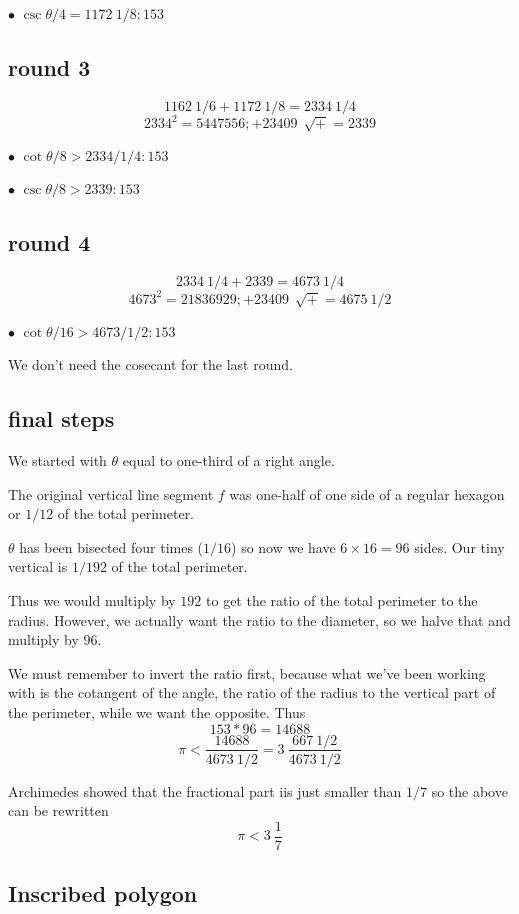 \documentclass[11pt, oneside]{article}
\begin{document}
$\bullet$  $\csc \theta/4 =1172 \ 1/8:153$

\subsection*{round 3}
\[ 1162 \ 1/6 + 1172 \ 1/8 = 2334 \ 1/4 \]
\[ 2334^2 = 5447556;  + 23409 \ \ \sqrt{+} = 2339 \]

$\bullet$  $\cot \theta/8 > 2334 / 1/4:153$ 

$\bullet$  $\csc \theta/8 > 2339:153$

\subsection*{round 4}
\[ 2334 \ 1/4 + 2339 = 4673 \ 1/4 \]
\[ 4673^2 = 21836929;  + 23409 \ \  \sqrt{+} = 4675 \ 1/2 \]

$\bullet$  $\cot \theta/16 > 4673 / 1/2:153$ 

We don't need the cosecant for the last round. 

\subsection*{final steps}
We started with $\theta$ equal to one-third of a right angle.  

The original vertical line segment $f$ was one-half of one side of a regular hexagon or $1/12$ of the total perimeter.

$\theta$ has been bisected four times ($1/16$) so now we have $6 \times 16 = 96$ sides.  Our tiny vertical is $1/192$ of the total perimeter.

Thus we would multiply by $192$ to get the ratio of the total perimeter to the radius.  However, we actually want the ratio to the diameter, so we halve that and multiply by $96$.

We must remember to invert the ratio first, because what we've been working with is the cotangent of the angle, the ratio of the radius to the vertical part of the perimeter, while we want the opposite.  Thus
\[ 153 * 96 = 14688 \]
\[ \pi < \frac{14688}{4673 \ 1/2} = 3 \ \frac{667 \ 1/2}{4673 \ 1/2} \]

Archimedes showed that the fractional part iis just smaller than $1/7$ so the above can be rewritten
\[ \pi < 3 \ \frac{1} {7} \]

\subsection*{Inscribed polygon}
\end{document}
